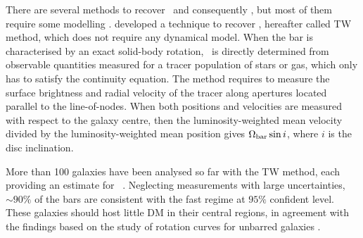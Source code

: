\documentclass{aa}
\begin{document}
There are several methods to recover \omegabar\ and consequently \rr, but most of them require some modelling \citep{Kormendy1979,Athanassoula1992,lindblad1996,puerari1997,Aguerri2000,Zhang2007,Rautiainen2008,font2011}. \citet{Tremaine1984} developed a technique to recover \omegabar, hereafter called TW method, which does not require any dynamical model. When the bar is characterised by an exact solid-body rotation, \omegabar\ is directly determined from observable quantities measured for a tracer population of stars or gas, which only has to satisfy the continuity equation. The method requires to measure the surface brightness and radial velocity of the tracer along apertures located parallel to the line-of-nodes. When both positions and velocities are measured with respect to the galaxy centre, then the luminosity-weighted mean velocity divided by the luminosity-weighted mean position gives $\Omega_{\rm bar}\sin i$, where $i$ is the disc inclination.

More than 100 galaxies have been analysed so far with the TW method, each providing an estimate for \rr\ \citep[see][for a review]{Cuomo2020}. Neglecting measurements with large uncertainties, $\sim90\%$ of the bars are consistent with the fast regime at $95\%$ confident level. These galaxies should host little DM in their central regions, in agreement with the findings based on the study of rotation curves for unbarred galaxies \citep{Debattista2000,Starkman2018}.
\end{document}
